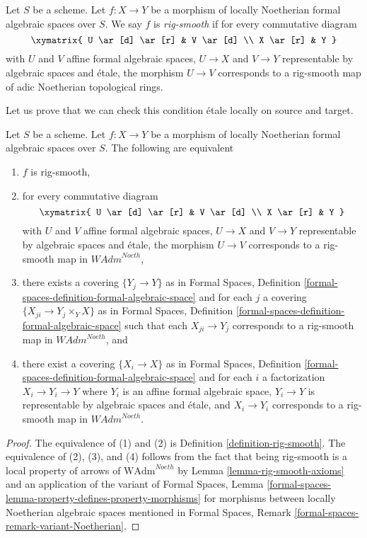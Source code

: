 \begin{definition}
\label{definition-rig-smooth}
Let $S$ be a scheme. Let $f : X \to Y$ be a morphism of locally
Noetherian formal algebraic spaces over $S$. We say $f$ is
{\it rig-smooth} if for every commutative diagram
$$
\xymatrix{
U \ar[d] \ar[r] & V \ar[d] \\
X \ar[r] & Y
}
$$
with $U$ and $V$ affine formal algebraic spaces, $U \to X$ and $V \to Y$
representable by algebraic spaces and \'etale, the morphism $U \to V$
corresponds to a rig-smooth map of adic Noetherian topological rings.
\end{definition}

\noindent
Let us prove that we can check this condition \'etale locally on
source and target.

\begin{lemma}
\label{lemma-rig-smooth-morphisms}
Let $S$ be a scheme. Let $f : X \to Y$ be a morphism of
locally Noetherian formal algebraic spaces over $S$.
The following are equivalent
\begin{enumerate}
\item $f$ is rig-smooth,
\item for every commutative diagram
$$
\xymatrix{
U \ar[d] \ar[r] & V \ar[d] \\
X \ar[r] & Y
}
$$
with $U$ and $V$ affine formal algebraic spaces, $U \to X$ and $V \to Y$
representable by algebraic spaces and \'etale, the morphism $U \to V$
corresponds to a rig-smooth map in $\textit{WAdm}^{Noeth}$,
\item there exists a covering $\{Y_j \to Y\}$ as in
Formal Spaces,
Definition \ref{formal-spaces-definition-formal-algebraic-space}
and for each $j$
a covering $\{X_{ji} \to Y_j \times_Y X\}$ as in
Formal Spaces,
Definition \ref{formal-spaces-definition-formal-algebraic-space}
such that each $X_{ji} \to Y_j$  corresponds
to a rig-smooth map in $\textit{WAdm}^{Noeth}$, and
\item there exist a covering $\{X_i \to X\}$ as in
Formal Spaces,
Definition \ref{formal-spaces-definition-formal-algebraic-space}
and for each $i$ a factorization $X_i \to Y_i \to Y$ where $Y_i$
is an affine formal algebraic space, $Y_i \to Y$ is representable
by algebraic spaces and \'etale, and $X_i \to Y_i$ corresponds
to a rig-smooth map in $\textit{WAdm}^{Noeth}$.
\end{enumerate}
\end{lemma}

\begin{proof}
The equivalence of (1) and (2) is Definition \ref{definition-rig-smooth}.
The equivalence of (2), (3), and (4) follows from the fact that
being rig-smooth is a local property of arrows of
$\text{WAdm}^{Noeth}$ by Lemma \ref{lemma-rig-smooth-axioms}
and an application of the variant of
Formal Spaces, Lemma
\ref{formal-spaces-lemma-property-defines-property-morphisms}
for morphisms between locally Noetherian algebraic spaces
mentioned in
Formal Spaces, Remark
\ref{formal-spaces-remark-variant-Noetherian}.
\end{proof}

